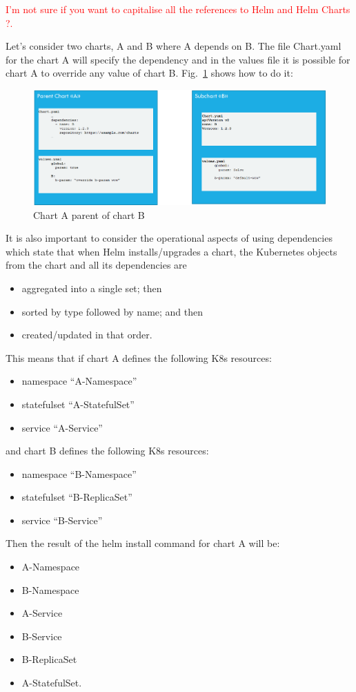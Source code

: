 \documentclass[a4paper]{spie}  %
\begin{document}
\textcolor{red}{I'm not sure if you want to capitalise all the references to Helm and Helm Charts ?.}

Let’s consider two charts, A and B where A depends on B. The file Chart.yaml for the chart A will specify the dependency and in the values file it is possible for chart A to override any value of chart B. Fig.~\ref{fig:a_parent_b} shows how to do it:

\begin{figure}[!htb]
   \centering
   \includegraphics*[width=0.8\columnwidth]{A_parent_B}
   \caption{Chart A parent of chart B}
   \label{fig:a_parent_b}
\end{figure}

It is also important to consider the operational aspects of using dependencies which state that when Helm installs/upgrades a chart, the Kubernetes objects from the chart and all its dependencies are
\begin{itemize}
    \item aggregated into a single set; then
    \item sorted by type followed by name; and then
    \item created/updated in that order.
\end{itemize}
This means that if chart A defines the following K8s resources:
\begin{itemize}
    \item namespace “A-Namespace”
    \item statefulset “A-StatefulSet”
    \item service “A-Service”
\end{itemize}
and chart B defines the following K8s resources:
\begin{itemize}
    \item namespace “B-Namespace”
    \item statefulset “B-ReplicaSet”
    \item service “B-Service”
\end{itemize}
Then the result of the helm install command for chart A will be:
\begin{itemize}
    \item A-Namespace
    \item B-Namespace
    \item A-Service
    \item B-Service
    \item B-ReplicaSet
    \item A-StatefulSet.
\end{itemize}
\end{document}
